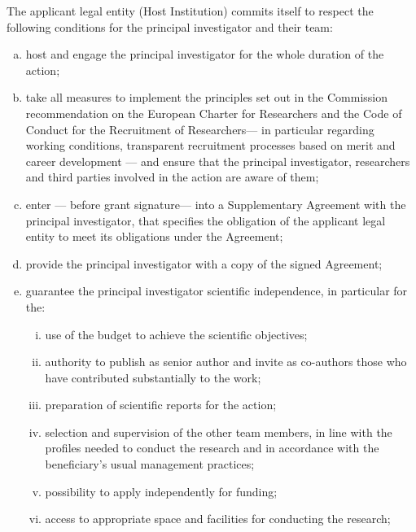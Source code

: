 \documentclass[12pt,a4paper]{article}
\begin{document}
The applicant legal entity (Host Institution) commits itself to respect the
following conditions for the principal investigator and their team:
\begin{enumerate}[a), itemsep=-2pt]
    \item host and engage the principal investigator for the whole duration of
    the action;

    \item take all measures to implement the principles set out in the Commission
    recommendation on the European Charter for Researchers and the Code of
    Conduct for the Recruitment of Researchers\footnotemark[4] --- in particular
    regarding working conditions, transparent recruitment processes based on
    merit and career development --- and ensure that the principal investigator,
    researchers and third parties involved in the action are aware of them;


    \item enter — before grant signature— into a Supplementary Agreement with
    the principal investigator, that specifies the obligation of the applicant
    legal entity to meet its obligations under the Agreement;

    \item provide the principal investigator with a copy of the signed Agreement;

    \item guarantee the principal investigator scientific independence, in
    particular for the:

    \begin{enumerate}[i),itemsep=-5pt,partopsep=-5pt]
        \item use of the budget to achieve the scientific objectives;
        \item authority to publish as senior author and invite as co-authors
        those who have contributed substantially to the work;
        \item preparation of scientific reports for the action;
        \item selection and supervision of the other team members, in line with
        the profiles needed to conduct the research and in accordance with the
        beneficiary's usual management practices;
        \item possibility to apply independently for funding;
        \item access to appropriate space and facilities for conducting the research;
    \end{enumerate}


\end{enumerate}
\end{document}
